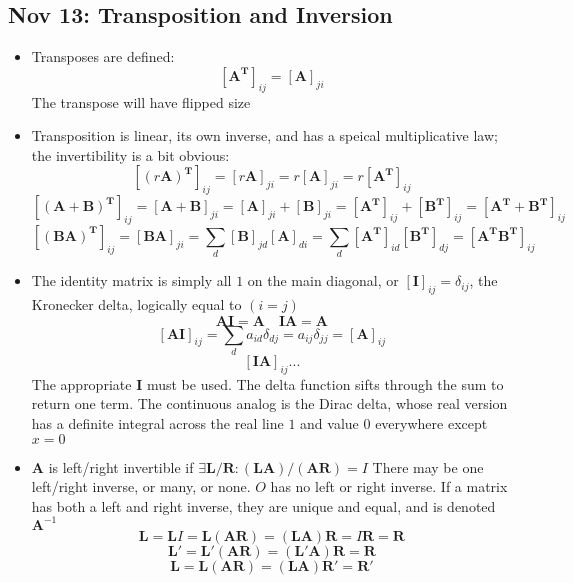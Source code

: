\documentclass[10pt, oneside]{article}
\newcommand{\mat}[1]{\mathbf{#1}}
\begin{document}
\subsection{Nov 13: Transposition and Inversion}
\begin{itemize}
    \item Transposes are defined:
        \[[\mat{A^T}]_{ij} = [\mat{A}]_{ji}\]
        The transpose will have flipped size
    \item Transposition is linear, its own inverse, and has a speical multiplicative law; the invertibility is a bit obvious:
        \[[(r\mat{A})^\mat{T}]_{ij} = [r\mat{A}]_{ji} = r[\mat{A}]_{ji} = r[\mat{A^T}]_{ij}\]
        \[[(\mat{A}+\mat{B})^\mat{T}]_{ij} = [\mat{A}+\mat{B}]_{ji} = [\mat{A}]_{ji}+[\mat{B}]_{ji} = [\mat{A^T}]_{ij} + [\mat{B^T}]_{ij} = [\mat{A^T} + \mat{B^T}]_{ij}\]
        \[[(\mat{B}\mat{A})^\mat{T}]_{ij} = [\mat{B}\mat{A}]_{ji} = \sum_{d}[\mat{B}]_{jd}[\mat{A}]_{di} = \sum_{d}[\mat{A^T}]_{id}[\mat{B^T}]_{dj} = [\mat{A^T} \mat{B^T}]_{ij}\]
    \item The identity matrix is simply all $1$ on the main diagonal, or $[\mat{I}]_{ij} = \delta_{ij}$, the Kronecker delta, logically equal to $(i = j)$
        \[\mat{A}\mat{I} = \mat{A} \quad \mat{I}\mat{A} = \mat{A}\]
        \[[\mat{A}\mat{I}]_{ij} = \sum_{d}a_{id} \delta_{dj} = a_{ij} \delta_{jj} = [\mat{A}]_{ij}\]
        \[[\mat{I}\mat{A}]_{ij} ...\]
        The appropriate $\mat{I}$ must be used. The delta function sifts through the sum to return one term. The continuous analog is the Dirac delta, whose real version has a definite integral across the real line $1$ and value $0$ everywhere except $x=0$
    \item $\mat{A}$ is left/right invertible if $\exists \mat{L}/\mat{R} : (\mat{L}\mat{A})/(\mat{A}\mat{R}) = I$
        There may be one left/right inverse, or many, or none. $O$ has no left or right inverse. If a matrix has both a left and right inverse, they are unique and equal, and is denoted $\mat{A}^{-1}$
        \[\mat{L} = \mat{L}I = \mat{L}(\mat{A}\mat{R}) = (\mat{L}\mat{A})\mat{R} = I\mat{R} = \mat{R}\]
        \[\mat{L}' = \mat{L}'(\mat{A}\mat{R}) = (\mat{L}'\mat{A})\mat{R} = \mat{R}\]
        \[\mat{L} = \mat{L}(\mat{A}\mat{R}) = (\mat{L}\mat{A})\mat{R}' = \mat{R}'\]
\end{itemize}
\end{document}
